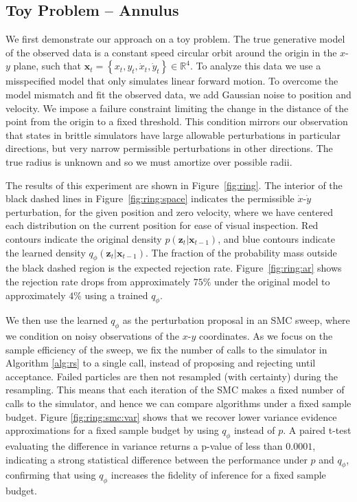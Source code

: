 \label{sec:experiments}

\subsection{Toy Problem -- Annulus}
\label{sec:annulus}
We first demonstrate our approach on a toy problem.
The true generative model of the observed data is a constant speed circular orbit around the origin in the $x$-$y$ plane, such that $\mathbf{x}_t = \left\lbrace x_t, y_t, \dot{x}_t, \dot{y}_t \right\rbrace \in  \mathbb{R}^4$.
To analyze this data we use a misspecified model that only simulates linear forward motion.
To overcome the model mismatch and fit the observed data, we add Gaussian noise to position and velocity.
We impose a failure constraint limiting the change in the distance of the point from the origin to a fixed threshold.
This condition mirrors our observation that states in brittle simulators have large allowable perturbations in particular directions, but very narrow permissible perturbations in other directions.
The true radius is unknown and so we must amortize over possible radii.



The results of this experiment are shown in Figure~\ref{fig:ring}.
The interior of the black dashed lines in Figure~\ref{fig:ring:space} indicates the permissible $\dot{x}$-$\dot{y}$ perturbation, for the given position and zero velocity, where we have centered each distribution on the current position for ease of visual inspection.
Red contours indicate the original density $p(\mathbf{z}_t | \mathbf{x}_{t-1})$, and blue contours indicate the learned density $q_{\phi}(\mathbf{z}_t | \mathbf{x}_{t-1})$.
The fraction of the probability mass outside the black dashed region is the expected rejection rate.
Figure~\ref{fig:ring:ar} shows the rejection rate drops from approximately $75\%$ under the original model to approximately $4\%$ using a trained $q_{\phi}$.



We then use the learned $q_{\phi}$ as the perturbation proposal in an SMC sweep, where we condition on noisy observations of the $x$-$y$ coordinates.
As we focus on the sample efficiency of the sweep, we fix the number of calls to the simulator in Algorithm \ref{alg:rs} to a single call, instead of proposing and rejecting until acceptance.
Failed particles are then not resampled (with certainty) during the resampling.
This means that each iteration of the SMC makes a fixed number of calls to the simulator, and hence we can compare algorithms under a fixed sample budget.
Figure \ref{fig:ring:smc:var} shows that we recover lower variance evidence approximations for a fixed sample budget by using $q_{\phi}$ instead of $p$.
A paired t-test evaluating the difference in variance returns a p-value of less than $0.0001$, indicating a strong statistical difference between the performance under $p$ and $q_{\phi}$, confirming that using $q_{\phi}$ increases the fidelity of inference for a fixed sample budget.

